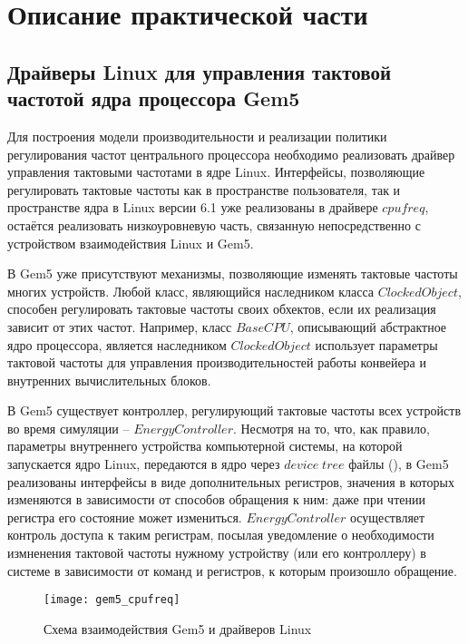 \section{Описание практической части}
\label{sec:Section4} 

\subsection{Драйверы Linux для управления тактовой частотой ядра процессора Gem5}

    Для построения модели производительности и реализации политики регулирования частот центрального процессора
    необходимо реализовать драйвер управления тактовыми частотами в ядре Linux. Интерфейсы, позволяющие регулировать
    тактовые частоты как в пространстве пользователя, так и пространстве ядра в Linux версии 6.1 уже
    реализованы в драйвере $cpufreq$, остаётся реализовать низкоуровневую часть, связанную непосредственно
    с устройством взаимодействия Linux и Gem5.

    В Gem5 уже присутствуют механизмы, позволяющие изменять тактовые частоты многих устройств. Любой
    класс, являющийся наследником класса $ClockedObject$, способен регулировать тактовые частоты своих
    обхектов, если их реализация зависит от этих частот. Например, класс $BaseCPU$, описывающий
    абстрактное ядро процессора, является наследником $ClockedObject$ использует параметры
    тактовой частоты для управления производительностей работы конвейера и внутренних вычислительных блоков.

    В Gem5 существует контроллер, регулирующий тактовые частоты всех устройств во время симуляции --
    $EnergyController$. Несмотря на то, что, как правило, параметры внутреннего устройства компьютерной
    системы, на которой запускается ядро Linux, передаются в ядро через $device \; tree$ файлы (\cite{KernelDocsDTS}),
    в Gem5 реализованы интерфейсы в виде дополнительных регистров, значения в которых изменяются
    в зависимости от способов обращения к ним: даже при чтении регистра его состояние может измениться.
    $EnergyController$ осуществляет контроль доступа к таким регистрам, посылая уведомление о
    необходимости измненения тактовой частоты нужному устройству (или его контроллеру) в системе
    в зависимости от команд и регистров, к которым произошло обращение.

    \begin{figure}[!h]
        \caption{Схема взаимодействия Gem5 и драйверов Linux}
        \centering
        \texttt{[image: gem5\_cpufreq]}
        \label{gem5_cpufreq}
    \end{figure}

